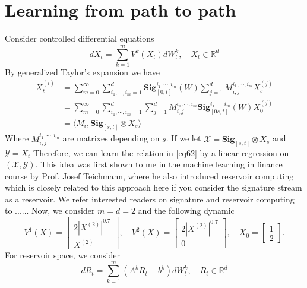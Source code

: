 \documentclass[12pt]{report}
\theoremstyle{definition}
\theoremstyle{remark}
\newcommand{\R}{\mathbb{R}}
\begin{document}
\section{Learning from path to path}
Consider controlled differential equations 
\begin{equation}
  dX_{t} = \sum_{k=1}^{m}V^{k}(X_{t})dW^{k}_{t},\quad X_{t}\in\R^{d}
\end{equation}
By generalized Taylor's expansion we have 
\begin{equation}\label{eq62}
    \begin{split}
        X^{(i)}_{t} &= \sum_{m=0}^{\infty}\sum_{i_{1},\cdots,i_{m} = 1}^{d}\mathbf{Sig}_{[0,t]}^{i_{1},\cdots,i_{m}}(W)\sum_{j=1}^{d}M^{i_{1},\cdots,i_{m}}_{i,j}X^{(j)}_{s}\\
        &= \sum_{m=0}^{\infty}\sum_{i_{1},\cdots,i_{m} = 1}^{d}\sum_{j=1}^{d}M^{i_{1},\cdots,i_{m}}_{i,j} \mathbf{Sig}_{[0s,t]}^{i_{1},\cdots,i_{m}}(W) X^{(j)}_{0}\\
        &= \langle M_{i} ,  \mathbf{Sig}_{[s,t]} \otimes X_{s} \rangle
    \end{split}
\end{equation}
Where $M^{i_{1},\cdots,i_{m}}_{i,j}$ are matrixes depending on $s$. If we let $\mathcal{X} = \mathbf{Sig}_{[s,t]} \otimes X_{s}$ and $\mathcal{Y} = X_{t}$
Therefore, we can learn the relation in \eqref{eq62} by a linear regression on $(\mathcal{X},\mathcal{Y})$. This idea was first shown to me in the machine learning in finance course by Prof. Josef Teichmann, where he also introduced reservoir computing which is closely related to this approach here if you consider the signature stream as a reservoir. We refer interested readers on signature and reservoir computing to ......  Now, we consider $m = d = 2$ and the following dynamic
\begin{equation*}
  V^{1}(X) = \begin{bmatrix}
    2|X^{(2)}|^{0.7}\\
    X^{(2)}
  \end{bmatrix},\quad 
  V^{2}(X) = \begin{bmatrix}
    2|X^{(2)}|^{0.7}\\
    0
  \end{bmatrix},\quad 
  X_{0} = \begin{bmatrix}
    1\\
    2
  \end{bmatrix}.
\end{equation*}
For reservoir space, we consider 
\begin{equation}
  dR_{t} = \sum_{k=1}^{m}(A^{k}R_{t} + b^{k})dW^{k}_{t},\quad R_{t}\in\R^{d}
\end{equation}
\end{document}
